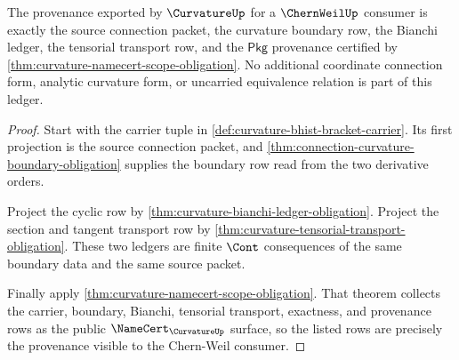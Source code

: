\begin{theorem}
\label{thm:curvature-chernweil-provenance-ledger}
The provenance exported by $\CurvatureUp$ for a $\ChernWeilUp$ consumer is exactly the source connection packet, the curvature boundary row, the Bianchi ledger, the tensorial transport row, and the $\mathsf{Pkg}$ provenance certified by \autoref{thm:curvature-namecert-scope-obligation}. No additional coordinate connection form, analytic curvature form, or uncarried equivalence relation is part of this ledger.
\end{theorem}
\begin{proof}
Start with the carrier tuple in \autoref{def:curvature-bhist-bracket-carrier}. Its first projection is the source connection packet, and \autoref{thm:connection-curvature-boundary-obligation} supplies the boundary row read from the two derivative orders.

Project the cyclic row by \autoref{thm:curvature-bianchi-ledger-obligation}. Project the section and tangent transport row by \autoref{thm:curvature-tensorial-transport-obligation}. These two ledgers are finite $\Cont$ consequences of the same boundary data and the same source packet.

Finally apply \autoref{thm:curvature-namecert-scope-obligation}. That theorem collects the carrier, boundary, Bianchi, tensorial transport, exactness, and provenance rows as the public $\NameCert_{\CurvatureUp}$ surface, so the listed rows are precisely the provenance visible to the Chern-Weil consumer.
\end{proof}

